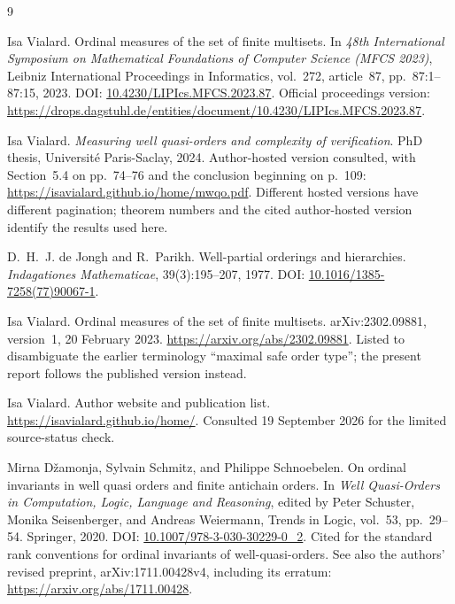 \documentclass[11pt,letterpaper]{article}
\theoremstyle{definition}
\theoremstyle{remark}
\begin{document}
\clearpage
\begin{thebibliography}{9}

Isa Vialard.
\newblock Ordinal measures of the set of finite multisets.
\newblock In \emph{48th International Symposium on Mathematical Foundations
of Computer Science (MFCS 2023)}, Leibniz International Proceedings in
Informatics, vol.~272, article~87, pp.~87:1--87:15, 2023.
\newblock DOI: \href{https://doi.org/10.4230/LIPIcs.MFCS.2023.87}{10.4230/LIPIcs.MFCS.2023.87}.
\newblock Official proceedings version:
\url{https://drops.dagstuhl.de/entities/document/10.4230/LIPIcs.MFCS.2023.87}.

Isa Vialard.
\newblock \emph{Measuring well quasi-orders and complexity of verification}.
\newblock PhD thesis, Universit\'e Paris-Saclay, 2024.
\newblock Author-hosted version consulted, with Section~5.4 on pp.~74--76
and the conclusion beginning on p.~109:
\url{https://isavialard.github.io/home/mwqo.pdf}.
\newblock Different hosted versions have different pagination; theorem
numbers and the cited author-hosted version identify the results used here.

D.~H.~J. de Jongh and R.~Parikh.
\newblock Well-partial orderings and hierarchies.
\newblock \emph{Indagationes Mathematicae}, 39(3):195--207, 1977.
\newblock DOI: \href{https://doi.org/10.1016/1385-7258(77)90067-1}{10.1016/1385-7258(77)90067-1}.

Isa Vialard.
\newblock Ordinal measures of the set of finite multisets.
\newblock arXiv:2302.09881, version~1, 20 February 2023.
\newblock \url{https://arxiv.org/abs/2302.09881}.
\newblock Listed to disambiguate the earlier terminology ``maximal safe
order type''; the present report follows the published version instead.

Isa Vialard.
\newblock Author website and publication list.
\newblock \url{https://isavialard.github.io/home/}.
\newblock Consulted 19 September 2026 for the limited source-status check.

Mirna D\v{z}amonja, Sylvain Schmitz, and Philippe Schnoebelen.
\newblock On ordinal invariants in well quasi orders and finite antichain
orders.
\newblock In \emph{Well Quasi-Orders in Computation, Logic, Language and
Reasoning}, edited by Peter Schuster, Monika Seisenberger, and Andreas
Weiermann, Trends in Logic, vol.~53, pp.~29--54. Springer, 2020.
\newblock DOI: \href{https://doi.org/10.1007/978-3-030-30229-0_2}{10.1007/978-3-030-30229-0\_2}.
\newblock Cited for the standard rank conventions for ordinal invariants of
well-quasi-orders. See also the authors' revised preprint,
arXiv:1711.00428v4, including its erratum:
\url{https://arxiv.org/abs/1711.00428}.

\end{thebibliography}
\end{document}
